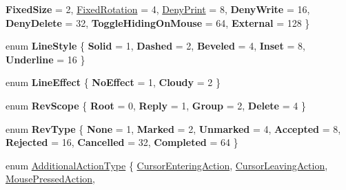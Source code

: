\begin{DoxyCompactItemize}
{\bfseries Fixed\+Size} = 2, 
\hyperlink{class_poppler_1_1_annotation_a8c2dca956649e4ce454361d5b75dc270a61bee11edae896858409dd65d14d3a70}{Fixed\+Rotation} = 4, 
\hyperlink{class_poppler_1_1_annotation_a8c2dca956649e4ce454361d5b75dc270abc4b217d0e1932558a182595a1ffadaf}{Deny\+Print} = 8, 
\newline
{\bfseries Deny\+Write} = 16, 
{\bfseries Deny\+Delete} = 32, 
{\bfseries Toggle\+Hiding\+On\+Mouse} = 64, 
{\bfseries External} = 128
 \}
\item 
\mbox{\label{class_poppler_1_1_annotation_a1161a85deb01303891e12b6550625c28}} 
enum {\bfseries Line\+Style} \{ \newline
{\bfseries Solid} = 1, 
{\bfseries Dashed} = 2, 
{\bfseries Beveled} = 4, 
{\bfseries Inset} = 8, 
\newline
{\bfseries Underline} = 16
 \}
\item 
\mbox{\label{class_poppler_1_1_annotation_a57ad1d13d00f9d186ce7ac3e7a3acd98}} 
enum {\bfseries Line\+Effect} \{ {\bfseries No\+Effect} = 1, 
{\bfseries Cloudy} = 2
 \}
\item 
\mbox{\label{class_poppler_1_1_annotation_ad1add377087c19d65ecfdaf0ed7ceb32}} 
enum {\bfseries Rev\+Scope} \{ {\bfseries Root} = 0, 
{\bfseries Reply} = 1, 
{\bfseries Group} = 2, 
{\bfseries Delete} = 4
 \}
\item 
\mbox{\label{class_poppler_1_1_annotation_a724faeb040662a8c3287f35925f67a18}} 
enum {\bfseries Rev\+Type} \{ \newline
{\bfseries None} = 1, 
{\bfseries Marked} = 2, 
{\bfseries Unmarked} = 4, 
{\bfseries Accepted} = 8, 
\newline
{\bfseries Rejected} = 16, 
{\bfseries Cancelled} = 32, 
{\bfseries Completed} = 64
 \}
\item 
enum \hyperlink{class_poppler_1_1_annotation_adab1fa85588b8f9fcdf20cdf37c1be97}{Additional\+Action\+Type} \{ \newline
\hyperlink{class_poppler_1_1_annotation_adab1fa85588b8f9fcdf20cdf37c1be97aee2c0fc83347cd007648580bcbbad7d0}{Cursor\+Entering\+Action}, 
\hyperlink{class_poppler_1_1_annotation_adab1fa85588b8f9fcdf20cdf37c1be97ac6dc3772b30bfa14e7508aff6fe80b10}{Cursor\+Leaving\+Action}, 
\hyperlink{class_poppler_1_1_annotation_adab1fa85588b8f9fcdf20cdf37c1be97a282cc09a8997b7a185131cbbca222305}{Mouse\+Pressed\+Action}, 

\end{DoxyCompactItemize}
